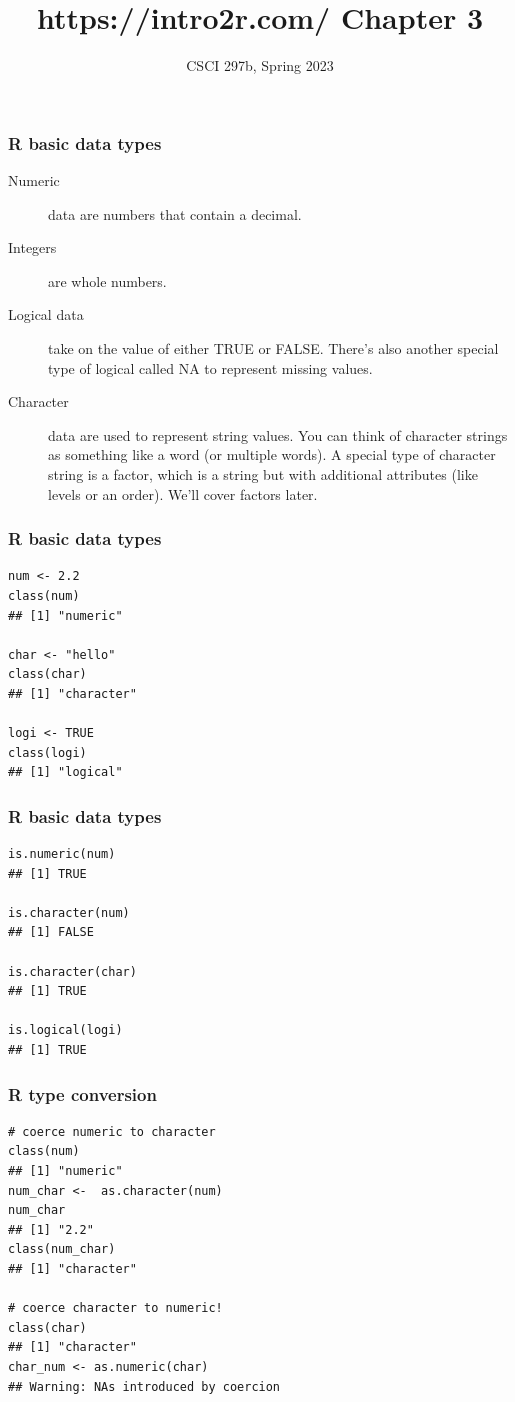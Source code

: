 \documentclass{beamer}
\title{{https://intro2r.com/} Chapter 3}
\author{CSCI 297b, Spring 2023}
\newcommand{\li}{\item}
\newcommand{\bfr}[1]{\begin{frame}[fragile]\frametitle{{ #1 }}}
\begin{document}
\small

\begin{frame}
\maketitle
\end{frame}

\bfr{R basic data types}
\begin{description}
\li[Numeric] data are numbers that contain a decimal.


\li[Integers] are whole numbers.

\li[Logical data] take on the value of either TRUE or FALSE. 
There's also another special type of logical called NA to represent missing values.

\li[Character] data are used to represent string values. You can think of character strings as something like a word (or multiple words). A special type of character string is a factor, which is a string but with additional attributes (like levels or an order). We’ll cover factors later.
\end{description}
\end{frame}


\bfr{R basic data types}
\begin{verbatim}
num <- 2.2
class(num)
## [1] "numeric"

char <- "hello"
class(char)
## [1] "character"

logi <- TRUE
class(logi)
## [1] "logical"
\end{verbatim}
\end{frame}


\bfr{R basic data types}
\begin{verbatim}
is.numeric(num)
## [1] TRUE

is.character(num)
## [1] FALSE

is.character(char)
## [1] TRUE

is.logical(logi)
## [1] TRUE
\end{verbatim}
\end{frame}



\bfr{R type conversion}
\begin{verbatim}
# coerce numeric to character
class(num)
## [1] "numeric"
num_char <-  as.character(num)
num_char
## [1] "2.2"
class(num_char)
## [1] "character"

# coerce character to numeric!
class(char)
## [1] "character"
char_num <- as.numeric(char)
## Warning: NAs introduced by coercion
\end{verbatim}
\end{frame}
\end{document}
